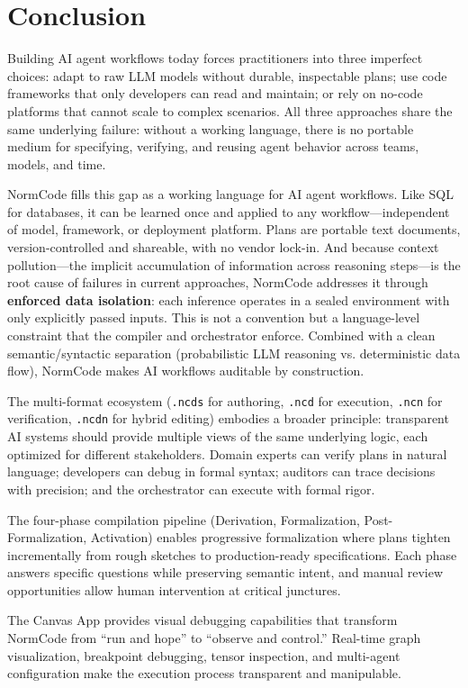 \section{Conclusion}

Building AI agent workflows today forces practitioners into three imperfect choices: adapt to raw LLM models without durable, inspectable plans; use code frameworks that only developers can read and maintain; or rely on no-code platforms that cannot scale to complex scenarios. All three approaches share the same underlying failure: without a working language, there is no portable medium for specifying, verifying, and reusing agent behavior across teams, models, and time.

NormCode fills this gap as a working language for AI agent workflows. Like SQL for databases, it can be learned once and applied to any workflow---independent of model, framework, or deployment platform. Plans are portable text documents, version-controlled and shareable, with no vendor lock-in. And because context pollution---the implicit accumulation of information across reasoning steps---is the root cause of failures in current approaches, NormCode addresses it through \textbf{enforced data isolation}: each inference operates in a sealed environment with only explicitly passed inputs. This is not a convention but a language-level constraint that the compiler and orchestrator enforce. Combined with a clean semantic/syntactic separation (probabilistic LLM reasoning vs. deterministic data flow), NormCode makes AI workflows auditable by construction.

The multi-format ecosystem (\texttt{.ncds} for authoring, \texttt{.ncd} for execution, \texttt{.ncn} for verification, \texttt{.ncdn} for hybrid editing) embodies a broader principle: transparent AI systems should provide multiple views of the same underlying logic, each optimized for different stakeholders. Domain experts can verify plans in natural language; developers can debug in formal syntax; auditors can trace decisions with precision; and the orchestrator can execute with formal rigor.

The four-phase compilation pipeline (Derivation, Formalization, Post-Formalization, Activation) enables progressive formalization where plans tighten incrementally from rough sketches to production-ready specifications. Each phase answers specific questions while preserving semantic intent, and manual review opportunities allow human intervention at critical junctures.

The Canvas App provides visual debugging capabilities that transform NormCode from ``run and hope'' to ``observe and control.'' Real-time graph visualization, breakpoint debugging, tensor inspection, and multi-agent configuration make the execution process transparent and manipulable.


